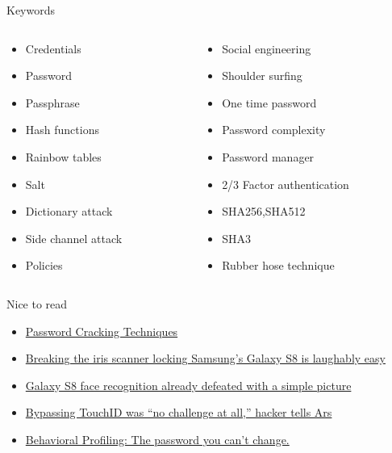 \documentclass{curs}
\begin{document}
\begin{frame}{Keywords}
  \begin{columns}
    \begin{column}{0.5\textwidth}
      \begin{itemize}
        \item Credentials
        \item Password
        \item Passphrase
        \item Hash functions
        \item Rainbow tables
        \item Salt
        \item Dictionary attack
        \item Side channel attack
        \item Policies
      \end{itemize}
    \end{column}
    \begin{column}{0.5\textwidth}
      \begin{itemize}
        \item Social engineering
        \item Shoulder surfing
        \item One time password
        \item Password complexity
        \item Password manager
        \item 2/3 Factor authentication
        \item SHA256,SHA512
        \item SHA3
        \item Rubber hose technique
      \end{itemize}
    \end{column}
  \end{columns}
\end{frame}

\begin{frame}{Nice to read}
  \begin{itemize}
    \item \href{http://books.expect-us.net/dl/Password_Cracking_Techniques.pdf}{Password Cracking Techniques}
    \item \href{https://arstechnica.com/information-technology/2017/05/breaking-the-iris-scanner-locking-samsungs-galaxy-s8-is-laughably-easy/}{Breaking the iris scanner locking Samsung’s Galaxy S8 is laughably easy}
    \item \href{https://arstechnica.com/gadgets/2017/03/video-shows-galaxy-s8-face-recognition-can-be-defeated-with-a-picture/}{Galaxy S8 face recognition already defeated with a simple picture}
    \item \href{https://arstechnica.com/information-technology/2013/09/touchid-hack-was-no-challenge-at-all-hacker-tells-ars/}{Bypassing TouchID was “no challenge at all,” hacker tells Ars}
    \item \href{https://paul.reviews/behavioral-profiling-the-password-you-cant-change/}{Behavioral Profiling: The password you can't change.}
  \end{itemize}
\end{frame}
\end{document}
